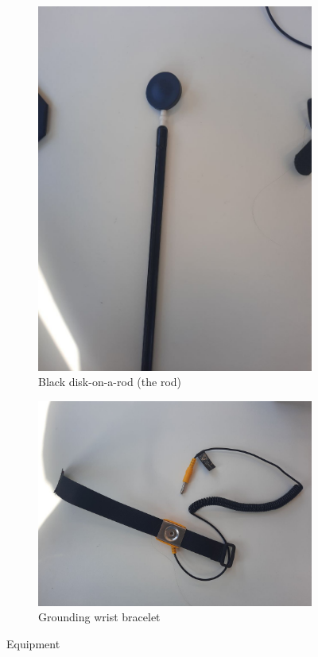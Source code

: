 \begin{figure}[H]
\begin{subfigure}[b]{0.33\textwidth}
        \includegraphics[width=\textwidth]{capacitors/img/setup/rod.jpg}
        \caption{Black disk-on-a-rod (the rod)}
    \end{subfigure}

    \vspace{0.5cm}

    \centering
    \begin{subfigure}[b]{0.33\textwidth}
        \centering
        \includegraphics[width=\textwidth]{capacitors/img/setup/bracelet.jpg}
        \caption{Grounding wrist bracelet}
    \end{subfigure}
    
    \caption{Equipment}
    \label{fig:methods:equipment}
\end{figure}

